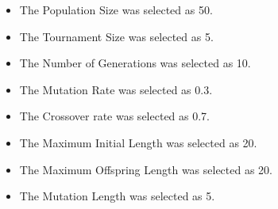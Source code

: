 \begin{itemize}
    \item The Population Size was selected as 50.
    \item The Tournament Size was selected as 5.
    \item The Number of Generations was selected as 10.
    \item The Mutation Rate was selected as 0.3.
    \item The Crossover rate was selected as 0.7.
    \item The Maximum Initial Length was selected as 20.
    \item The Maximum Offspring Length was selected as 20.
    \item The Mutation Length was selected as 5.
\end{itemize}